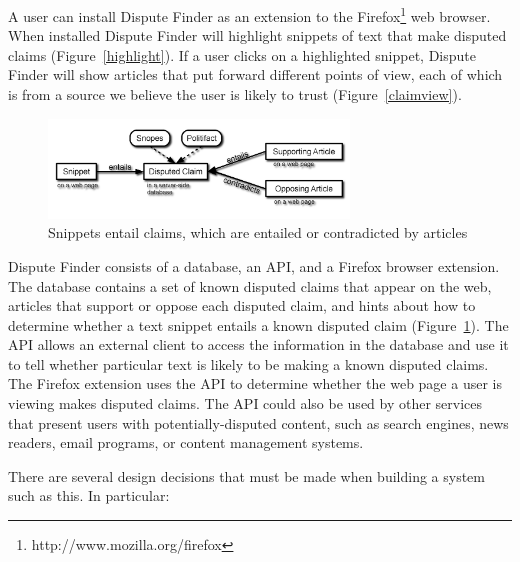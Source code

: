 \documentclass{www2010-submission}
\newcommand{\todo}[1]{}
\begin{document}
A user can install Dispute Finder as an extension to the Firefox\footnote{http://www.mozilla.org/firefox} web browser. When installed Dispute Finder will highlight snippets of text that make disputed claims (Figure~\ref{highlight}). 
If a user clicks on a highlighted snippet, Dispute Finder will show articles that put forward different points of view,  each of which is from a source we believe the user is likely to trust (Figure~\ref{claimview}). 

\begin{figure}[tb]
	\begin{center}
	\includegraphics[width=8cm]{pictures/snippet_claim_article_fancy2.png}
	\caption{Snippets entail claims, which are entailed or contradicted by articles}
	\label{snippet_claim_article}
	\end{center}
\end{figure}

Dispute Finder consists of a database, an API, and a Firefox browser extension. The database contains a set of known disputed claims that appear on the web, articles that support or oppose each disputed claim, and hints about how to determine whether a text snippet entails a known disputed claim (Figure~\ref{snippet_claim_article}). The API allows an external client to access the information in the database and use it to tell whether particular text is likely to be making a known disputed claims. The Firefox extension uses the API to determine whether the web page a user is viewing makes disputed claims. The API could also be used by other services that present users with potentially-disputed content, such as search engines, news readers, email programs, or content management systems.

\todo{Figure that does a smaller highlight}

There are several design decisions that must be made when building a system such as this. In particular:
\end{document}
